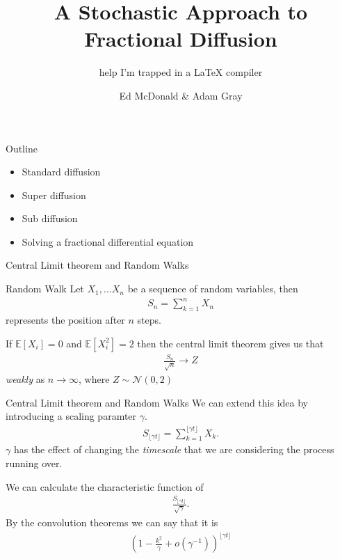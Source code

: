 \documentclass[pdf]{beamer}
\title{A Stochastic Approach to Fractional Diffusion}
\subtitle{help I'm trapped in a LaTeX compiler}
\author{Ed McDonald \& Adam Gray}
\institute{
	School of Mathematics and Statistics \\
	University of New South Wales
}
\newcommand{\lra}{\longrightarrow}
\begin{document}
\begin{frame}
	\titlepage
\end{frame}

\begin{frame}{Outline}
    \begin{itemize}
        \item Standard diffusion
        \item Super diffusion
        \item Sub diffusion
        \item Solving a fractional differential equation
    \end{itemize}
\end{frame}


\begin{frame}{Central Limit theorem and Random Walks}
	\begin{block}{Random Walk}
	    Let $ X_1, \ldots X_n $ be a sequence of random variables,
	    then 
	    \begin{align}
	        S_n = \sum_{k=1}^n X_n 
	    \end{align}
	    represents the position after $ n $ steps.
	\end{block}
	If $ \mathbb{E}[X_i] = 0 $ and  $ \mathbb{E}[X_i^2] = 2 $ then the central limit theorem gives us that
	\begin{align}
	    \frac{S_n}{\sqrt{n}} \lra Z
	\end{align}
	\emph{weakly} as $ n \lra \infty $, where $ Z \sim \mathcal{N}(0,2) $
\end{frame}

\begin{frame}{Central Limit theorem and Random Walks}
    We can extend this idea by introducing a scaling paramter $ \gamma $.
    \begin{align}
        S_{\lfloor \gamma t \rfloor} = \sum_{k=1}^{\lfloor \gamma t \rfloor} X_k.
    \end{align}
    $ \gamma $ has the effect of changing the \emph{timescale} that we are considering the process running over.
    
    We can calculate the characteristic function of 
    \begin{align}
       \frac{S_{\lfloor \gamma t \rfloor}}{\sqrt{\gamma }}.
    \end{align}
    By the convolution theorems we can say that it is
    \begin{align}
        \left( 1- \frac{k^2}{\gamma} + o(\gamma^{-1}) \right)^{\lfloor \gamma t \rfloor}
    \end{align}
\end{frame}
\end{document}
